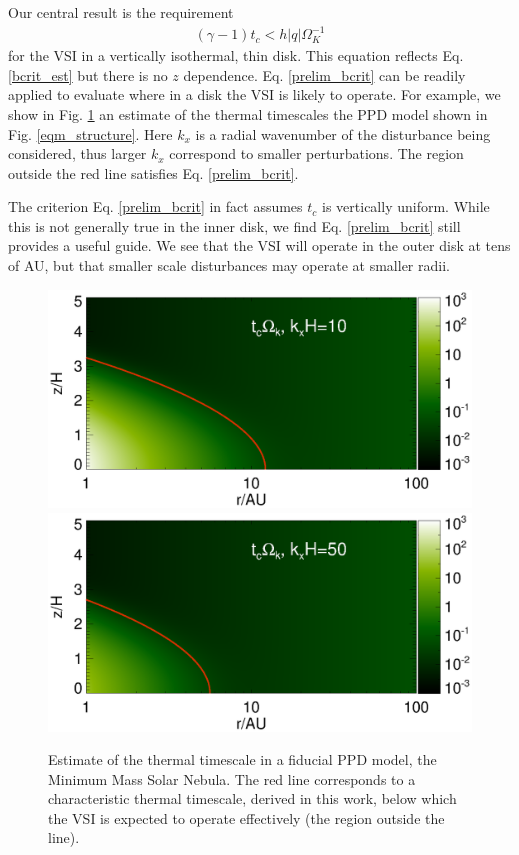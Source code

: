 \documentclass[iop]{emulateapj}
\begin{document}
Our central result is the requirement 
\begin{align}\label{prelim_bcrit}
  (\gamma - 1)t_c <  h |q| \Omega_K^{-1}
\end{align}   
for the VSI in a vertically isothermal, thin disk. This equation
reflects Eq. \ref{bcrit_est} but there is no $z$ dependence. 
Eq. \ref{prelim_bcrit} can be 
readily applied to evaluate where in a disk the VSI is likely to
operate. For example, we show in Fig. \ref{bcrit_mmsn2d} an estimate
of the thermal timescales the PPD model shown in
Fig. \ref{eqm_structure}. Here $k_x$ is a radial
wavenumber of the disturbance being considered, thus larger $k_x$
correspond to smaller perturbations. The region outside the red line
satisfies Eq. \ref{prelim_bcrit}. 

The criterion Eq. \ref{prelim_bcrit} in fact
assumes $t_c$ is vertically uniform. While this is not generally true
in the inner disk, we find Eq. \ref{prelim_bcrit} still provides a
useful guide. We see that the VSI will operate in the outer 
disk at tens of AU, but that smaller scale disturbances may operate at
smaller radii. 

\begin{figure}
  \includegraphics[width=\linewidth,clip=true,trim=0cm 1.7cm 0cm
  0.73cm]{figures/bcrit_mmsn2d_kx10}
  \includegraphics[width=\linewidth,clip=true,trim=0cm 0.46cm 0cm
  0.73cm]{figures/bcrit_mmsn2d_kx50}
  \caption{Estimate of the thermal timescale  in a fiducial 
    PPD model, the Minimum Mass Solar Nebula. The red
    line corresponds to a characteristic thermal timescale, derived in
    this work, below which the VSI is expected to operate effectively
    (the region outside the line).    
    \label{bcrit_mmsn2d} 
  }
\end{figure}
\end{document}
